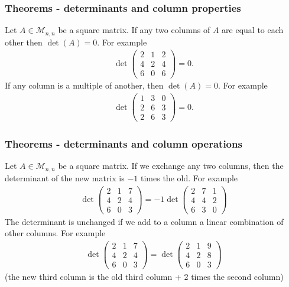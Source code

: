 \documentclass[usenames,dvipsnames,aspectratio=169,10pt]{beamer}
\numberwithin{equation}{section}
\begin{document}
\begin{frame}
\frametitle{Theorems - determinants and column properties}
Let $A\in\mathcal{M}_{n,n}$ be a square matrix. If any two columns of $A$ are equal to each other then $\det(A)=0$. For example
\begin{align*}
\det\begin{pmatrix}
 2 &  1 & 2 \\
 4 &  2 & 4 \\
 6 &  0 & 6 
\end{pmatrix}
=0.
\end{align*}
If any column is a multiple of another, then $\det(A)=0$. For example
\begin{align*}
\det\begin{pmatrix}
 1 &  3 & 0 \\
 2 &  6 & 3 \\
 2 &  6 & 3 
\end{pmatrix}
=0.
\end{align*}
\end{frame}





\begin{frame}
\frametitle{Theorems - determinants and column operations}
Let $A\in\mathcal{M}_{n,n}$ be a square matrix. If we exchange any two columns, then the determinant of the new matrix is $-1$ times the old. For example
\begin{align*}
\det\begin{pmatrix}
 2 &  1 & 7 \\
 4 &  2 & 4 \\
 6 &  0 & 3 
\end{pmatrix}
=-1
\det\begin{pmatrix}
 2 &  7 & 1 \\
 4 &  4 & 2 \\
 6 &  3 & 0 
\end{pmatrix}
\end{align*}
The determinant is unchanged if we add to a column a linear combination of other columns. For example
\begin{align*}
\det\begin{pmatrix}
 2 &  1 & 7 \\
 4 &  2 & 4 \\
 6 &  0 & 3 
\end{pmatrix}
=
\det\begin{pmatrix}
 2 &  1 & 9 \\
 4 &  2 & 8 \\
 6 &  0 & 3 
\end{pmatrix}
\end{align*}
(the new third column is the old third column + 2 times the second column)
\end{frame}
\end{document}
